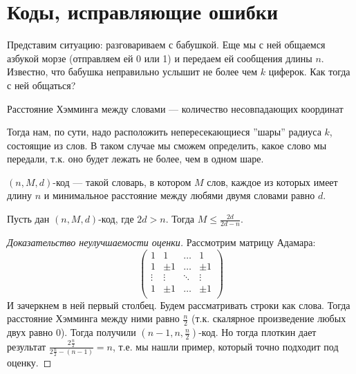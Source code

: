 \section{Коды, исправляющие ошибки}
Представим ситуацию: разговариваем с бабушкой. Еще мы с ней общаемся азбукой морзе (отправляем ей 0 или 1) и передаем ей сообщения длины \(n\). Известно, что бабушка неправильно услышит не более чем \(k\) циферок. Как тогда с ней общаться?
\begin{definition}
    Расстояние Хэмминга между словами --- количество несовпадающих координат
\end{definition}
Тогда нам, по сути, надо расположить непересекающиеся ''шары'' радиуса \(k\), состоящие из слов. В таком случае мы сможем определить, какое слово мы передали, т.к. оно будет лежать не более, чем в одном шаре.
\begin{definition}
    \((n, M, d)\)-код --- такой словарь, в котором \(M\) слов, каждое из которых имеет длину \(n\) и минимальное расстояние между любями двумя словами равно \(d\).
\end{definition}
\begin{theorem}
    Пусть дан \((n, M, d)\)-код, где \(2d > n\). Тогда \(M  \le \frac{2d}{2d - n}\).
\end{theorem}
\begin{proof}[Доказательство неулучшаемости оценки]
    Рассмотрим матрицу Адамара:
    \[\left(\begin{array}{cccc}
        1 & 1 & \dots &  1 \\
        1 & \pm 1 & \dots & \pm 1 \\
        \vdots & \vdots & \ddots & \vdots\\
        1 & \pm 1 & \dots & \pm 1 \\
    \end{array}\right)\]
    И зачеркнем в ней первый столбец. Будем рассматривать строки как слова. Тогда расстояние Хэмминга между ними равно \(\frac{n}{2}\) (т.к. скалярное произведение любых двух равно 0). Тогда получили \(\left(n-1, n, \frac{n}{2}\right)\)-код. Но тогда плоткин дает результат \(\frac{2\frac{n}{2}}{2\frac{n}{2} - (n - 1)} = n\), т.е. мы нашли пример, который точно подходит под оценку.
\end{proof}